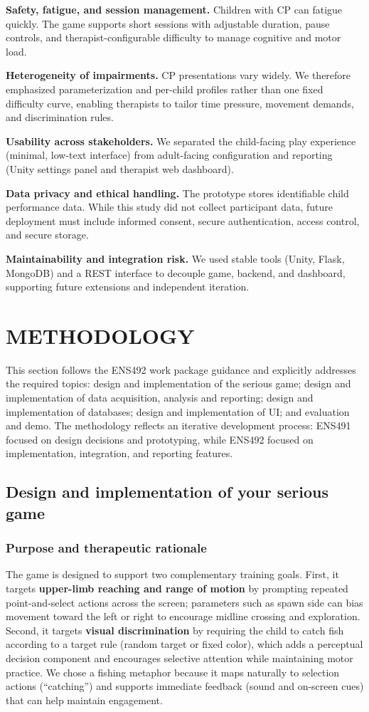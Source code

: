 \documentclass[12pt]{article}
\begin{document}
\textbf{Safety, fatigue, and session management.} Children with CP can fatigue quickly. The game supports short sessions with adjustable duration, pause controls, and therapist-configurable difficulty to manage cognitive and motor load.

\textbf{Heterogeneity of impairments.} CP presentations vary widely. We therefore emphasized parameterization and per-child profiles rather than one fixed difficulty curve, enabling therapists to tailor time pressure, movement demands, and discrimination rules.

\textbf{Usability across stakeholders.} We separated the child-facing play experience (minimal, low-text interface) from adult-facing configuration and reporting (Unity settings panel and therapist web dashboard).

\textbf{Data privacy and ethical handling.} The prototype stores identifiable child performance data. While this study did not collect participant data, future deployment must include informed consent, secure authentication, access control, and secure storage.

\textbf{Maintainability and integration risk.} We used stable tools (Unity, Flask, MongoDB) and a REST interface to decouple game, backend, and dashboard, supporting future extensions and independent iteration.

\clearpage
\section{METHODOLOGY}
This section follows the ENS492 work package guidance and explicitly addresses the required topics: design and implementation of the serious game; design and implementation of data acquisition, analysis and reporting; design and implementation of databases; design and implementation of UI; and evaluation and demo. The methodology reflects an iterative development process: ENS491 focused on design decisions and prototyping, while ENS492 focused on implementation, integration, and reporting features.

\subsection{Design and implementation of your serious game}
\subsubsection*{Purpose and therapeutic rationale}
The game is designed to support two complementary training goals. First, it targets \textbf{upper-limb reaching and range of motion} by prompting repeated point-and-select actions across the screen; parameters such as spawn side can bias movement toward the left or right to encourage midline crossing and exploration. Second, it targets \textbf{visual discrimination} by requiring the child to catch fish according to a target rule (random target or fixed color), which adds a perceptual decision component and encourages selective attention while maintaining motor practice. We chose a fishing metaphor because it maps naturally to selection actions (``catching'') and supports immediate feedback (sound and on-screen cues) that can help maintain engagement.
\end{document}
